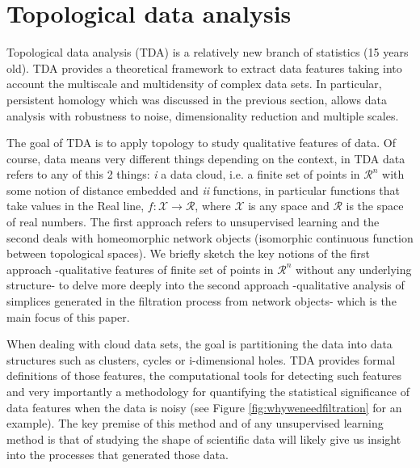 \documentclass[onecollarge,runningheads]{svjour2}
\begin{document}
\section{Topological data analysis}
\label{se:tda}

Topological data analysis (TDA) is a relatively new branch of statistics (15 years old). TDA provides a theoretical framework to extract data features taking into account the multiscale and multidensity of complex data sets. In particular, persistent homology which was discussed in the previous section, allows data analysis with robustness to noise, dimensionality reduction and multiple scales.

The goal of TDA is to apply topology to study qualitative features of data. Of course, data means very different things depending on the context, in TDA data refers to any of this 2 things: \emph{i} a data cloud, i.e. a finite set of points in $\mathcal{R}^n$ with some notion of distance embedded and \emph{ii} functions, in particular functions that take values in the Real line, $f:\mathcal{X} \to \mathcal{R}$, where $\mathcal{X}$ is any space and $\mathcal{R}$ is the space of real numbers. The first approach refers to unsupervised learning and the second deals with homeomorphic network objects (isomorphic continuous function between topological spaces). We briefly sketch the key notions of the first approach -qualitative features of finite set of points in $\mathcal{R}^n$ without any underlying structure- to delve more deeply into the second approach -qualitative analysis of simplices generated in the filtration process from network objects- which is the main focus of this paper.

When dealing with cloud data sets, the goal is partitioning the data into data structures such as clusters, cycles or i-dimensional holes. TDA provides formal definitions of those features, the computational tools for detecting such features and very importantly a methodology for quantifying the statistical significance of data features when the data is noisy (see Figure \ref{fig:whyweneedfiltration} for an example). The key premise of this method and of any unsupervised learning method is that of studying the shape of scientific data will likely give us insight into the processes that generated those data.
\end{document}
